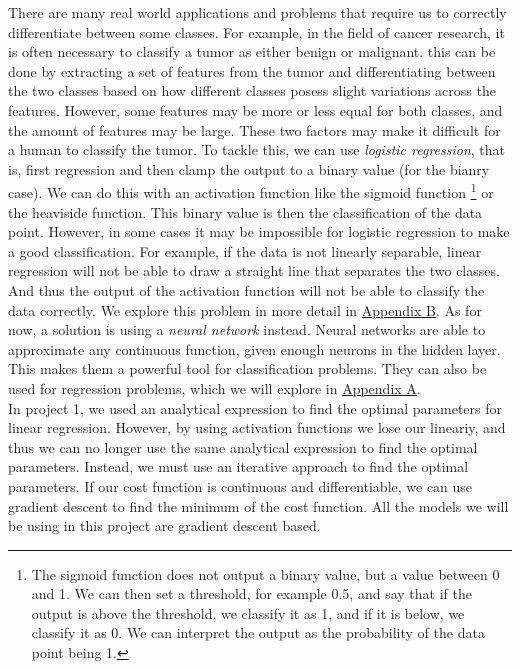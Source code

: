 \documentclass[twoside,11pt]{report}
\begin{document}
    There are many real world applications and problems that require us to correctly differentiate 
    between some classes. For example, in the field of
    cancer research, it is often necessary to classify a tumor as either benign or malignant. this
    can be done by extracting a set of features from the tumor and differentiating between the two
    classes based on how different classes posess slight variations across the features. 
    However, some features may be more or less equal for both classes, and the
    amount of features may be large. These two factors may make it difficult for a human to classify the tumor.
    To tackle this, we can use \emph{logistic regression}, that is, first regression and then clamp the 
    output to a binary value (for the bianry case). We can do this with an activation function like the sigmoid function
    \footnote
    {
        The sigmoid function does not output a binary value, but a value between 0 and 1. 
        We can then set a threshold, for example 0.5, and say that if the output is above the threshold, 
        we classify it as 1, and if it is below, we classify it as 0. We can interpret the output as the 
        probability of the data point being 1.
    }
    or the heaviside function. This binary value is then the classification of the data point.
    However, in some cases it may be impossible for logistic regression to make a good classification.
    For example, if the data is not linearly separable, linear regression will not be able to draw a
    straight line that separates the two classes. And thus the output of the activation function will
    not be able to classify the data correctly. We explore this problem in more detail in 
    \hyperref[app:appendixB]{Appendix B}. As for now, a solution is using a \emph{neural network} instead.
    Neural networks are able to approximate any continuous function, given enough neurons in the hidden layer.
    This makes them a powerful tool for classification problems. They can also be used for regression problems,
    which we will explore in \hyperref[app:appendixA]{Appendix A}.\\
    
    \noindent
    In project 1\cite{MachineLearningProjects_2023}, we used an analytical expression to find the optimal parameters
    for linear regression. However, by using activation functions we lose our lineariy, and thus we can no longer
    use the same analytical expression to find the optimal parameters. Instead, we must use an iterative approach
    to find the optimal parameters. If our cost function is continuous and differentiable, we can use gradient descent
    to find the minimum of the cost function. All the models we will be using in this project are gradient descent based.\\
\end{document}
